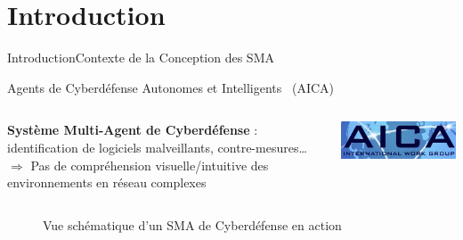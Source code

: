 

\addtocounter{framenumber}{-1}

\section{Introduction}

\begin{frame}{Introduction}{Contexte de la Conception des SMA}

    \begin{center}
        \begin{minipage}{0.95\linewidth}
            \centering
            \begin{exampleblock}{Agents de Cyberdéfense Autonomes et Intelligents~\parencite{Kott2023} (AICA)}

                \begin{columns}
                    \hspace{5ex}
                    \begin{column}{0.85\textwidth}
                        \textbf{Système Multi-Agent de Cyberdéfense} : identification de logiciels malveillants, contre-mesures\dots \\
                        $\Longrightarrow$ Pas de compréhension visuelle/intuitive des environnements en réseau complexes
                    \end{column}
                    \begin{column}{0.22\textwidth}
                        \hspace{-2.5ex}
                        \includegraphics[width=0.8\linewidth]{figures/AICA_IWG.jpg}
                    \end{column}
                \end{columns}

            \end{exampleblock}
        \end{minipage}
    \end{center}

    \begin{figure}
        \centering
        
        \caption*{Vue schématique d'un SMA de Cyberdéfense en action}
        \label{fig:my_label}
    \end{figure}

\end{frame}

